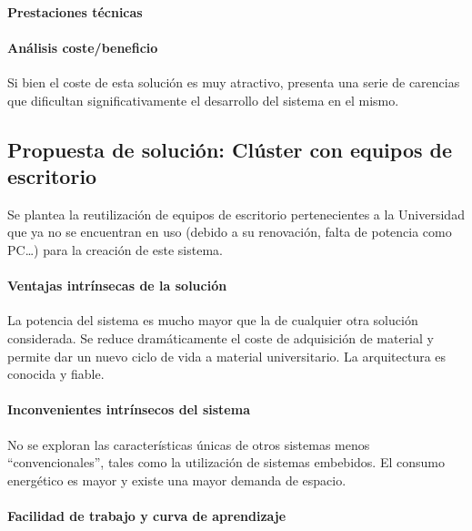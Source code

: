 \paragraph{Prestaciones técnicas\\}

\citationneeded[Andrés]{}

\paragraph{Análisis coste/beneficio\\}

Si bien el coste de esta solución es muy atractivo, presenta una serie de carencias que dificultan significativamente el desarrollo del sistema en el mismo. 


\subsection{Propuesta de solución: Clúster con equipos de escritorio}

Se plantea la reutilización de equipos de escritorio pertenecientes a la Universidad que ya no se encuentran en uso (debido a su renovación, falta de potencia como PC\dots) para la creación de este sistema.

\paragraph{Ventajas intrínsecas de la solución\\}

La potencia del sistema es mucho mayor que la de cualquier otra solución considerada. Se reduce dramáticamente el coste de adquisición de material y permite dar un nuevo ciclo de vida a material universitario. La arquitectura es conocida y fiable.

\paragraph{Inconvenientes intrínsecos del sistema\\}

No se exploran las características únicas de otros sistemas menos ``convencionales'', tales como la utilización de sistemas embebidos. El consumo energético es mayor y existe una mayor demanda de espacio.%

\paragraph{Facilidad de trabajo y curva de aprendizaje\\}

